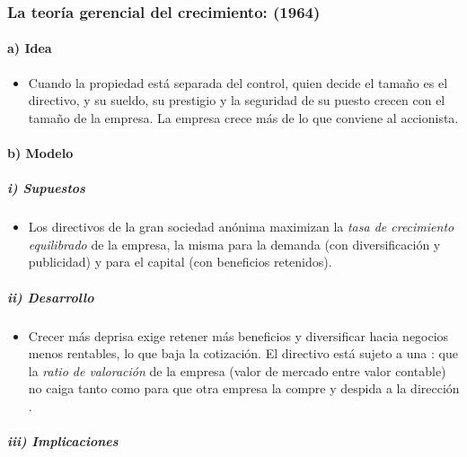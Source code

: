 \documentclass[11pt]{article}
\begin{document}
\subsubsection{La teoría gerencial del crecimiento:  (1964)}\label{sec:marris}

\paragraph{a) Idea}

\begin{itemize}
\item Cuando la propiedad está separada del control\nocite{BerleMeans1932Modern}, quien decide el tamaño es el directivo, y su sueldo, su prestigio y la seguridad de su puesto crecen con el tamaño de la empresa. La empresa crece más de lo que conviene al accionista.
\end{itemize}

\paragraph{b) Modelo}

\subparagraph{i) Supuestos}

\begin{itemize}
\item Los directivos de la gran sociedad anónima maximizan la \emph{tasa de crecimiento equilibrado} de la empresa, la misma para la demanda (con diversificación y publicidad) y para el capital (con beneficios retenidos)\nocite{Marris1963Model,Marris1964Economic}.
\end{itemize}

\subparagraph{ii) Desarrollo}

\begin{itemize}
\item Crecer más deprisa exige retener más beneficios y diversificar hacia negocios menos rentables, lo que baja la cotización. El directivo está sujeto a una : que la \emph{ratio de valoración} de la empresa (valor de mercado entre valor contable) no caiga tanto como para que otra empresa la compre y despida a la dirección .
\end{itemize}

\subparagraph{iii) Implicaciones}
\end{document}
